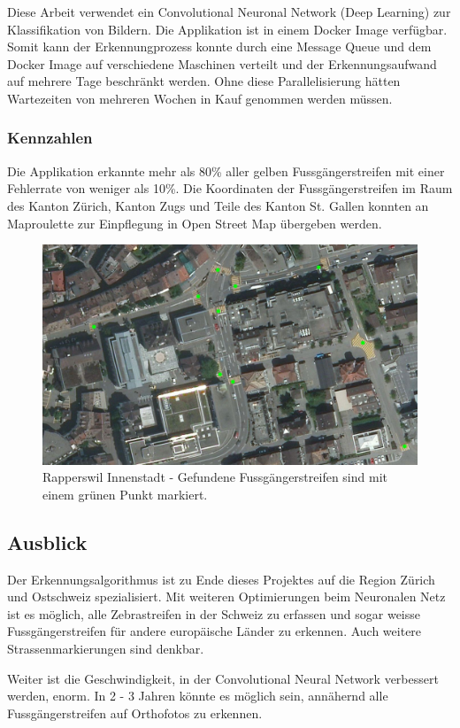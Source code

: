 Diese Arbeit verwendet ein Convolutional Neuronal Network (Deep Learning) zur Klassifikation von Bildern. Die Applikation ist in einem Docker Image verfügbar. Somit kann der Erkennungprozess konnte durch eine Message Queue und dem Docker Image auf verschiedene Maschinen verteilt und der Erkennungsaufwand auf mehrere Tage beschränkt werden. Ohne diese Parallelisierung hätten Wartezeiten von mehreren Wochen in Kauf genommen werden müssen.

\subsubsection{Kennzahlen}
Die Applikation erkannte mehr als 80\% aller gelben Fussgängerstreifen mit einer Fehlerrate von weniger als 10\%. Die Koordinaten der Fussgängerstreifen im Raum des Kanton Zürich, Kanton Zugs und Teile des Kanton St. Gallen konnten an Maproulette zur Einpflegung in Open Street Map übergeben werden.
\\
\begin{figure}[H]
	\centering
	\includegraphics[width=\textwidth -10mm]{images/boxsave_rappi.png}
	\caption[Überblick]{Rapperswil Innenstadt - Gefundene Fussgängerstreifen sind mit einem grünen Punkt markiert.}
\end{figure}

\subsection*{Ausblick}
Der Erkennungsalgorithmus ist zu Ende dieses Projektes auf die Region Zürich und Ostschweiz spezialisiert. Mit weiteren Optimierungen beim Neuronalen Netz ist es möglich, alle Zebrastreifen in der Schweiz zu erfassen und sogar weisse Fussgängerstreifen für andere europäische Länder zu erkennen. Auch weitere Strassenmarkierungen sind denkbar.

Weiter ist die Geschwindigkeit, in der Convolutional Neural Network verbessert werden, enorm. In 2 - 3 Jahren könnte es möglich sein, annähernd alle Fussgängerstreifen auf Orthofotos zu erkennen.
\newpage
